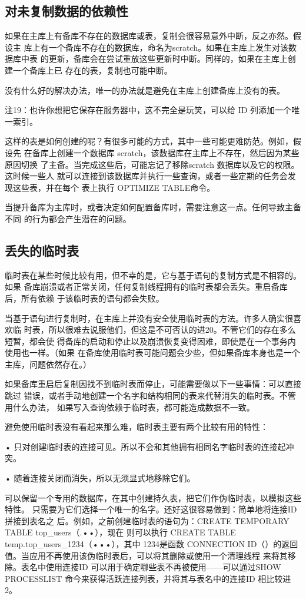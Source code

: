 \subsection{对未复制数据的依赖性}
如果在主库上有备库不存在的数据库或表，复制会很容易意外中断，反之亦然。假设主
库上有一个备库不存在的数据库，命名为scratch。如果在主库上发生对该数据库中表
的更新，备库会在尝试重放这些更新时中断。同样的，如果在主库上创建一个备库上已
存在的表，复制也可能中断。

没有什么好的解决办法，唯一的办法就是避免在主库上创建备库上没有的表。

注19：也许你想把它保存在服务器中，这不完全是玩笑，可以给 ID 列添加一个唯一索引。

这样的表是如何创建的呢？有很多可能的方式，其中一些可能更难防范。例如，假设先
在备库上创建一个数据库 scratch，该数据库在主库上不存在，然后因为某些原因切换
了主备。当完成这些后，可能忘记了移除scratch 数据库以及它的权限。这时候一些人
就可以连接到该数据库并执行一些查询，或者一些定期的任务会发现这些表，并在每个
表上执行 OPTIMIZE TABLE命令。

当提升备库为主库时，或者决定如何配置备库时，需要注意这一点。任何导致主备不同
的行为都会产生潜在的问题。

\subsection{丢失的临时表}
临时表在某些时候比较有用，但不幸的是，它与基于语句的复制方式是不相容的。如果
备库崩溃或者正常关闭，任何复制线程拥有的临时表都会丢失。重启备库后，所有依赖
于该临时表的语句都会失败。

当基于语句进行复制时，在主库上并没有安全使用临时表的方法。许多人确实很喜欢临
时表，所以很难去说服他们，但这是不可否认的进20。不管它们的存在多么短暂，都会使
得备库的启动和停止以及崩溃恢复变得困难，即使是在一个事务内使用也一样。（如果
在备库使用临时表可能问题会少些，但如果备库本身也是一个主库，问题依然存在。）

如果备库重启后复制因找不到临时表而停止，可能需要做以下一些事情：可以直接跳过
错误，或者手动地创建一个名字和结构相同的表来代替消失的临时表。不管用什么办法，
如果写入查询依赖于临时表，都可能造成数据不一致。

避免使用临时表没有看起来那么难，临时表主要有两个比较有用的特性：

• 只对创建临时表的连接可见。所以不会和其他拥有相同名字临时表的连接起冲突。

• 随着连接关闭而消失，所以无须显式地移除它们。

可以保留一个专用的数据库，在其中创建持久表，把它们作伪临时表，以模拟这些特性。
只需要为它们选择一个唯一的名字。还好这很容易做到：简单地将连接ID 拼接到表名之
后。例如，之前创建临时表的语句为：CREATE TEMPORARY TABLE top\_users（.••），现在
则可以执行 CREATE TABLE temp.top\_users\_1234（•••），其中 1234是函数 CONNECTION
ID（）的返回值。当应用不再使用该伪临时表后，可以将其删除或使用一个清理线程
来将其移除。表名中使用连接ID 可以用于确定哪些表不再被使用——可以通过SHOW
PROCESSLIST 命今来获得活跃连接列表，并将其与表名中的连接ID 相比较进2。

